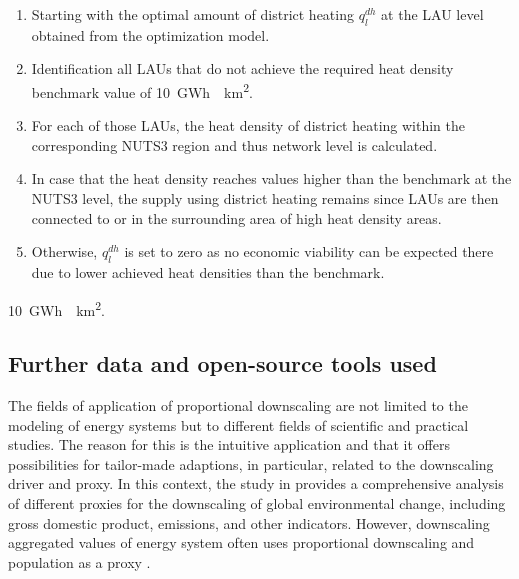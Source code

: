 \begin{enumerate}
	\item Starting with the optimal amount of district heating $q^{dh}_l$ at the LAU level obtained from the optimization model.
	\item Identification all LAUs that do not achieve the required heat density benchmark value of \SI{10}{GWh \per km^2}.
	\item For each of those LAUs, the heat density of district heating within the corresponding NUTS3 region and thus network level is calculated. 
	\item In case that the heat density reaches values higher than the benchmark at the NUTS3 level, the supply using district heating remains since LAUs are then connected to or in the surrounding area of high heat density areas. 
	\item Otherwise, $q^{dh}_l$ is set to zero as no economic viability can be expected there due to lower achieved heat densities than the benchmark. 
\end{enumerate}

 \SI{10}{GWh \per km^2}.

\subsection{Further data and open-source tools used}\label{open}
 The fields of application of proportional downscaling are not limited to the modeling of energy systems but to different fields of scientific and practical studies. The reason for this is the intuitive application and that it offers possibilities for tailor-made adaptions, in particular, related to the downscaling driver and proxy. In this context, the study in \cite{van2006downscaling} provides a comprehensive analysis of different proxies for the downscaling of global environmental change, including gross domestic product, emissions, and other indicators. However, downscaling aggregated values of energy system often uses proportional downscaling and population as a proxy \cite{alam2018downscaling}. 

